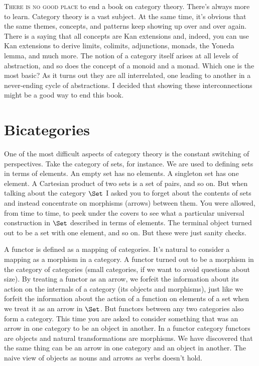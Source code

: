 \lettrine[lhang=0.17]{T}{here is no good place} to end a book on category theory. There's always
more to learn. Category theory is a vast subject. At the same time, it's
obvious that the same themes, concepts, and patterns keep showing up
over and over again. There is a saying that all concepts are Kan
extensions and, indeed, you can use Kan extensions to derive limits,
colimits, adjunctions, monads, the Yoneda lemma, and much more. The
notion of a category itself arises at all levels of abstraction, and so
does the concept of a monoid and a monad. Which one is the most basic?
As it turns out they are all interrelated, one leading to another in a
never-ending cycle of abstractions. I decided that showing these
interconnections might be a good way to end this book.

\section{Bicategories}

One of the most difficult aspects of category theory is the constant
switching of perspectives. Take the category of sets, for instance. We
are used to defining sets in terms of elements. An empty set has no
elements. A singleton set has one element. A Cartesian product of two
sets is a set of pairs, and so on. But when talking about the category
$\Set$ I asked you to forget about the contents of sets and
instead concentrate on morphisms (arrows) between them. You were
allowed, from time to time, to peek under the covers to see what a
particular universal construction in $\Set$ described in terms of
elements. The terminal object turned out to be a set with one element,
and so on. But these were just sanity checks.

A functor is defined as a mapping of categories. It's natural to
consider a mapping as a morphism in a category. A functor turned out to
be a morphism in the category of categories (small categories, if we
want to avoid questions about size). By treating a functor as an arrow,
we forfeit the information about its action on the internals of a
category (its objects and morphisms), just like we forfeit the
information about the action of a function on elements of a set when we
treat it as an arrow in $\Set$. But functors between any two
categories also form a category. This time you are asked to consider
something that was an arrow in one category to be an object in another.
In a functor category functors are objects and natural transformations
are morphisms. We have discovered that the same thing can be an arrow in
one category and an object in another. The naive view of objects as
nouns and arrows as verbs doesn't hold.

